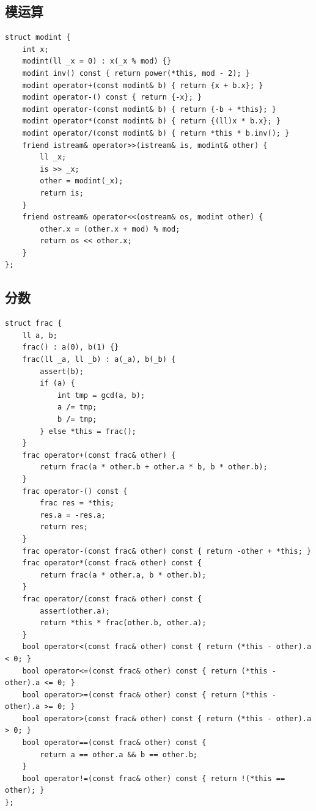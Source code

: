 \documentclass[UTF8]{ctexart}
\begin{document}
\begin{sloppypar}
\subsection{模运算}

\begin{lstlisting}[style=cpp]
struct modint {
    int x;
    modint(ll _x = 0) : x(_x % mod) {}
    modint inv() const { return power(*this, mod - 2); }
    modint operator+(const modint& b) { return {x + b.x}; }
    modint operator-() const { return {-x}; }
    modint operator-(const modint& b) { return {-b + *this}; }
    modint operator*(const modint& b) { return {(ll)x * b.x}; }
    modint operator/(const modint& b) { return *this * b.inv(); }
    friend istream& operator>>(istream& is, modint& other) {
        ll _x;
        is >> _x;
        other = modint(_x);
        return is;
    }
    friend ostream& operator<<(ostream& os, modint other) {
        other.x = (other.x + mod) % mod;
        return os << other.x;
    }
};
\end{lstlisting}

\subsection{分数}

\begin{lstlisting}[style=cpp]
struct frac {
    ll a, b;
    frac() : a(0), b(1) {}
    frac(ll _a, ll _b) : a(_a), b(_b) {
        assert(b);
        if (a) {
            int tmp = gcd(a, b);
            a /= tmp;
            b /= tmp;
        } else *this = frac();
    }
    frac operator+(const frac& other) {
        return frac(a * other.b + other.a * b, b * other.b);
    }
    frac operator-() const {
        frac res = *this;
        res.a = -res.a;
        return res;
    }
    frac operator-(const frac& other) const { return -other + *this; }
    frac operator*(const frac& other) const {
        return frac(a * other.a, b * other.b);
    }
    frac operator/(const frac& other) const {
        assert(other.a);
        return *this * frac(other.b, other.a);
    }
    bool operator<(const frac& other) const { return (*this - other).a < 0; }
    bool operator<=(const frac& other) const { return (*this - other).a <= 0; }
    bool operator>=(const frac& other) const { return (*this - other).a >= 0; }
    bool operator>(const frac& other) const { return (*this - other).a > 0; }
    bool operator==(const frac& other) const {
        return a == other.a && b == other.b;
    }
    bool operator!=(const frac& other) const { return !(*this == other); }
};
\end{lstlisting}


\end{sloppypar}
\end{document}
